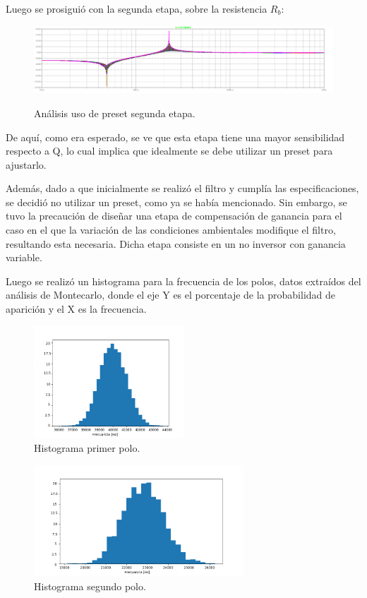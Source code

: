 Luego se prosiguió con la segunda etapa, sobre la resistencia $R_b$:
\begin{figure}[H]
	\centering
	\includegraphics[width=\textwidth]{Imagenes-Ej3/mcPoteR3E2.png}
	\label{fig:presete2}
	\caption{Análisis uso de preset segunda etapa.}
\end{figure}

De aquí, como era esperado, se ve que esta etapa tiene una mayor sensibilidad respecto a Q, lo cual implica que idealmente se debe utilizar un preset para ajustarlo.

Además, dado a que inicialmente se realizó el filtro y cumplía las especificaciones, se decidió no utilizar un preset, como ya se había mencionado. Sin embargo, se tuvo la precaución de diseñar una etapa de compensación de ganancia para el caso en el que la variación de las condiciones ambientales modifique el filtro, resultando esta necesaria. Dicha etapa consiste en un no inversor con ganancia variable.

Luego se realizó un histograma para la frecuencia de los polos, datos extraídos del análisis de Montecarlo, donde el eje Y es el porcentaje de la probabilidad de aparición y el X es la frecuencia.
\begin{figure}[H]
	\centering
	\includegraphics[width=0.5\textwidth]{Imagenes-Ej3/histW01.png}
	\caption{Histograma primer polo.}
	\label{fig:hist1}
\end{figure}
\begin{figure}[H]
	\centering
	\includegraphics[width=0.7\textwidth]{Imagenes-Ej3/histW02.png}
	\caption{Histograma segundo polo.}
	\label{fig:hist2}
\end{figure}

